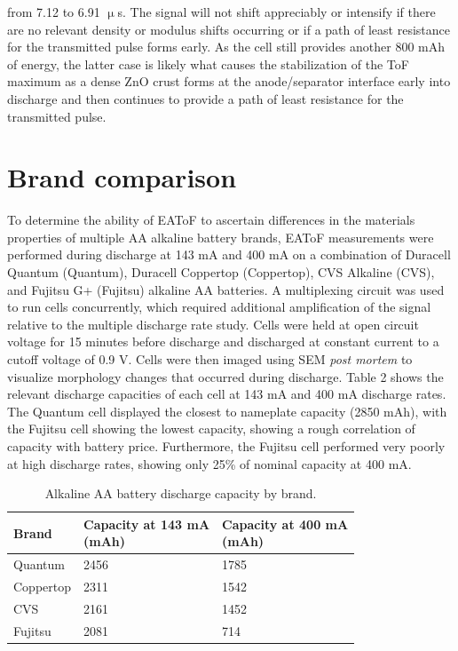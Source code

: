 from 7.12 to 6.91 $\upmu$s. The signal will not shift appreciably or intensify if there are no relevant density or modulus shifts occurring or if a path of least resistance for the transmitted pulse forms early. As the cell still provides another 800 mAh of energy, the latter case is likely what causes the stabilization of the ToF maximum as a dense ZnO crust forms at the anode/separator interface early into discharge and then continues to provide a path of least resistance for the transmitted pulse.

\section{Brand comparison}


To determine the ability of EAToF to ascertain differences in the materials properties of multiple AA alkaline battery brands, EAToF measurements were performed during discharge at 143 mA and 400 mA on a combination of Duracell Quantum (Quantum), Duracell Coppertop (Coppertop), CVS Alkaline (CVS), and Fujitsu G+ (Fujitsu) alkaline AA batteries. A multiplexing circuit was used to run cells concurrently, which required additional amplification of the signal relative to the multiple discharge rate study. Cells were held at open circuit voltage for 15 minutes before discharge and discharged at constant current to a cutoff voltage of 0.9 V. Cells were then imaged using SEM \textit{post mortem} to visualize morphology changes that occurred during discharge. Table 2 shows the relevant discharge capacities of each cell at 143 mA and 400 mA discharge rates. The Quantum cell displayed the closest to nameplate capacity (2850 mAh), with the Fujitsu cell showing the lowest capacity, showing a rough correlation of capacity with battery price. Furthermore, the Fujitsu cell performed very poorly at high discharge rates, showing only 25\% of nominal capacity at 400 mA.

\begin{table}[htb]
\centering
  \caption{\label{tab:brandtable}Alkaline AA battery discharge capacity by brand.}
  \begin{tabular}{*{3}{l}}
    \hline
       Brand & \specialcell{Capacity at 143 mA\\(mAh)} & \specialcell{Capacity at 400 mA\\(mAh)}\\
    \hline
        Quantum & 2456 & 1785 \\
        Coppertop & 2311 & 1542\\
        CVS & 2161 & 1452\\
        Fujitsu & 2081 & 714\\
  \end{tabular}
\end{table}


